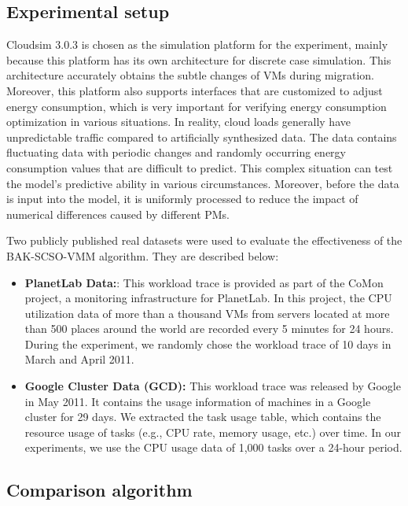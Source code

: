 \documentclass[conference]{{IEEEtran}}
\begin{document}
\subsection{Experimental setup}

Cloudsim 3.0.3 is chosen as the simulation platform for the experiment, mainly because this platform has its own architecture for discrete case simulation. This architecture accurately obtains the subtle changes of VMs during migration. Moreover, this platform also supports interfaces that are customized to adjust energy consumption, which is very important for verifying energy consumption optimization in various situations. In reality, cloud loads generally have unpredictable traffic compared to artificially synthesized data. The data contains fluctuating data with periodic changes and randomly occurring energy consumption values that are difficult to predict. This complex situation can test the model's predictive ability in various circumstances. Moreover, before the data is input into the model, it is uniformly processed to reduce the impact of numerical differences caused by different PMs.

Two publicly published real datasets were used to evaluate the effectiveness of the BAK-SCSO-VMM algorithm. They are described below:

\begin{itemize}
\item\textbf{PlanetLab Data:}: This workload trace is provided as part of the CoMon project, a monitoring infrastructure for PlanetLab. In this project, the CPU utilization data of more than a thousand VMs from servers located at more than 500 places around the world are recorded every 5 minutes for 24 hours. During the experiment, we randomly chose the workload trace of 10 days in March and April 2011.

\item \textbf{Google Cluster Data (GCD):} This workload trace was released by Google in May 2011. It contains the usage information of machines in a Google cluster for 29 days. We extracted the task usage table, which contains the resource usage of tasks (e.g., CPU rate, memory usage, etc.) over time. In our experiments, we use the CPU usage data of 1,000 tasks over a 24-hour period.  

\end{itemize}

\subsection{Comparison algorithm}
\end{document}
